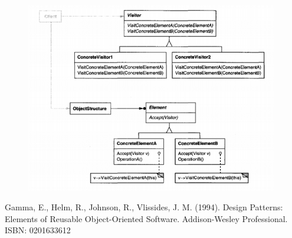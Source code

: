 \documentclass{article}
\begin{document}
\begin{figure}[h]
    \centering
    \includegraphics[width=11cm]{diagrams/pattern-23-visitor.png}
\end{figure}

\begin{thebibliography}{}
\bibitem{}
Gamma, E., Helm, R., Johnson, R., Vlissides, J. M. (1994). Design Patterns: Elements of Reusable Object-Oriented Software. Addison-Wesley Professional. ISBN: 0201633612

\end{thebibliography}
\end{document}
